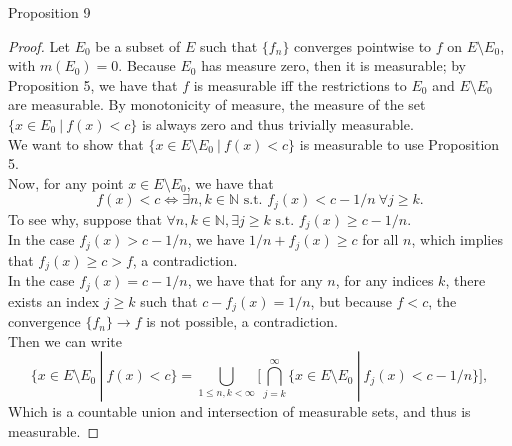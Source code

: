 \begin{flushleft}
\begin{namedthm*}{Proposition 9}
    \end{namedthm*}
    \begin{proof}
        Let $E_0$ be a subset of $E$ such that $\{f_n\}$ converges pointwise to $f$ on $E\setminus E_0$, with $m(E_0)=0$. 
        Because $E_0$ has measure zero, then it is measurable; by Proposition 5, we have that $f$ is measurable iff the restrictions to $E_0$ and $E\setminus E_0$ are measurable.
        By monotonicity of measure, the measure of the set $\{x\in E_0\ |\ f(x)<c\}$ is always zero and thus trivially measurable.
        \\We want to show that $\{x\in E\setminus E_0\ |\ f(x)<c\}$ is measurable to use Proposition 5.
        \\Now, for any point $x\in E\setminus E_0$, we have that
        \[
            f(x)<c\iff\exists n,k\in\mathbb{N}\text{ s.t. }f_j(x)<c-1/n\ \forall j\ge k.    
        \]
        To see why, suppose that $\forall n,k\in\mathbb{N}, \exists j\ge k\text{ s.t. } f_j(x)\ge c-1/n$.
        \\In the case $f_j(x) > c-1/n$, we have $1/n+f_j(x)\ge c$ for all $n$, which implies that $f_j(x)\ge c>f$, a contradiction.
        \\In the case $f_j(x) = c-1/n$, we have that for any $n$, for any indices $k$, there exists an index $j\ge k$ such that $c-f_j(x)=1/n$, but because $f<c$, the convergence $\{f_n\}\to f$ is not possible, a contradiction.
        \\Then we can write 
        \[
            \{x\in E\setminus E_0\ |\ f(x)<c\}=\bigcup_{1\le n,k<\infty} \biggl[\bigcap_{j=k}^\infty\{x\in E\setminus E_0\ |\ f_j(x)<c-1/n\} \biggr],
        \]
        Which is a countable union and intersection of measurable sets, and thus is measurable.
    \end{proof}


\end{flushleft}

